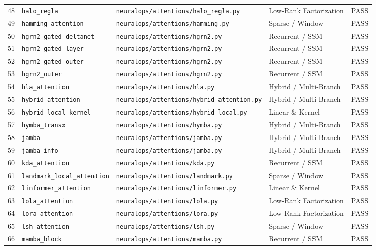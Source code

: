 \begin{center}
\begin{longtable}{rllll}
48 & \texttt{halo\_regla} & \texttt{neuralops/attentions/halo\_regla.py} & Low-Rank Factorization & PASS \\
49 & \texttt{hamming\_attention} & \texttt{neuralops/attentions/hamming.py} & Sparse / Window & PASS \\
50 & \texttt{hgrn2\_gated\_deltanet} & \texttt{neuralops/attentions/hgrn2.py} & Recurrent / SSM & PASS \\
51 & \texttt{hgrn2\_gated\_layer} & \texttt{neuralops/attentions/hgrn2.py} & Recurrent / SSM & PASS \\
52 & \texttt{hgrn2\_gated\_outer} & \texttt{neuralops/attentions/hgrn2.py} & Recurrent / SSM & PASS \\
53 & \texttt{hgrn2\_outer} & \texttt{neuralops/attentions/hgrn2.py} & Recurrent / SSM & PASS \\
54 & \texttt{hla\_attention} & \texttt{neuralops/attentions/hla.py} & Hybrid / Multi-Branch & PASS \\
55 & \texttt{hybrid\_attention} & \texttt{neuralops/attentions/hybrid\_attention.py} & Hybrid / Multi-Branch & PASS \\
56 & \texttt{hybrid\_local\_kernel} & \texttt{neuralops/attentions/hybrid\_local.py} & Linear \& Kernel & PASS \\
57 & \texttt{hymba\_transx} & \texttt{neuralops/attentions/hymba.py} & Hybrid / Multi-Branch & PASS \\
58 & \texttt{jamba} & \texttt{neuralops/attentions/jamba.py} & Hybrid / Multi-Branch & PASS \\
59 & \texttt{jamba\_info} & \texttt{neuralops/attentions/jamba.py} & Hybrid / Multi-Branch & PASS \\
60 & \texttt{kda\_attention} & \texttt{neuralops/attentions/kda.py} & Recurrent / SSM & PASS \\
61 & \texttt{landmark\_local\_attention} & \texttt{neuralops/attentions/landmark.py} & Sparse / Window & PASS \\
62 & \texttt{linformer\_attention} & \texttt{neuralops/attentions/linformer.py} & Linear \& Kernel & PASS \\
63 & \texttt{lola\_attention} & \texttt{neuralops/attentions/lola.py} & Low-Rank Factorization & PASS \\
64 & \texttt{lora\_attention} & \texttt{neuralops/attentions/lora.py} & Low-Rank Factorization & PASS \\
65 & \texttt{lsh\_attention} & \texttt{neuralops/attentions/lsh.py} & Sparse / Window & PASS \\
66 & \texttt{mamba\_block} & \texttt{neuralops/attentions/mamba.py} & Recurrent / SSM & PASS \\

\end{longtable}
\end{center}
